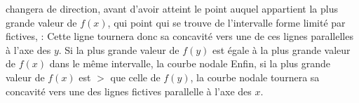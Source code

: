 \documentclass[11pt,a4paper]{article}
\begin{document}

changera de direction, avant d'avoir atteint le point auquel
appartient la plus grande valeur de $f(x)$, qui 
 point qui se trouve   de l'intervalle forme
limité par   fictives, 
: Cette ligne tournera donc sa concavité vers une
 de ces lignes parallelles à l'axe des $y$. Si la plus
grande valeur de $f(y)$ est égale à la plus grande valeur
de $f(x)$ dans le même intervalle, la courbe nodale 
Enfin, si la plus grande
valeur de $f(x)$ est $>$ que celle de $f(y)$, la courbe
nodale tournera sa concavité vers une des lignes
fictives parallelle à l'axe des $x$.
\end{document}
